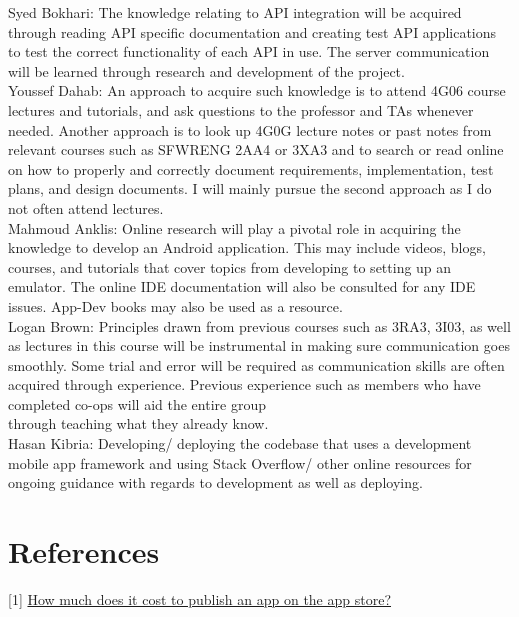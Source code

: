 \documentclass[12pt,letterpaper]{article}
\begin{document}
\noindent Syed Bokhari: The knowledge relating to API integration will be acquired through reading API specific documentation and creating test API applications to test the correct functionality of each API in use. The server communication will be learned through research and development of the project.\\

\noindent Youssef Dahab: An approach to acquire such knowledge is to attend 4G06 course lectures and tutorials, and ask questions to the professor and TAs whenever needed. Another approach is to look up 4G0G lecture notes or past notes from relevant courses such as SFWRENG 2AA4 or 3XA3 and to search or read online on how to properly and correctly document requirements, implementation, test plans, and design documents. I will mainly pursue the second approach as I do not often attend lectures.\\

\noindent Mahmoud Anklis: Online research will play a pivotal role in acquiring the knowledge to develop an Android application. This may include videos, blogs, courses, and tutorials that cover topics from developing to setting up an emulator. The online IDE documentation will also be consulted for any IDE issues. App-Dev books may also be used as a resource.\\

\noindent Logan Brown: Principles drawn from previous courses such as 3RA3, 3I03, as well as lectures in this course will be instrumental in making sure communication goes smoothly. Some trial and error will be required as communication skills are often acquired through experience. Previous experience such as members who have completed co-ops will aid the entire group\\ through teaching what they already know.\\

\noindent Hasan Kibria: Developing/ deploying the codebase that uses a development mobile app framework and using Stack Overflow/ other online resources for ongoing guidance with regards to development as well as deploying.\\

\newpage 

\section{References}
[1] \href{https://www.appypie.com/faqs/how-much-does-it-cost-to-publish-an-app-on-the-app-store}{\color{blue}How much does it cost to publish an app on the app store?}
\end{document}
